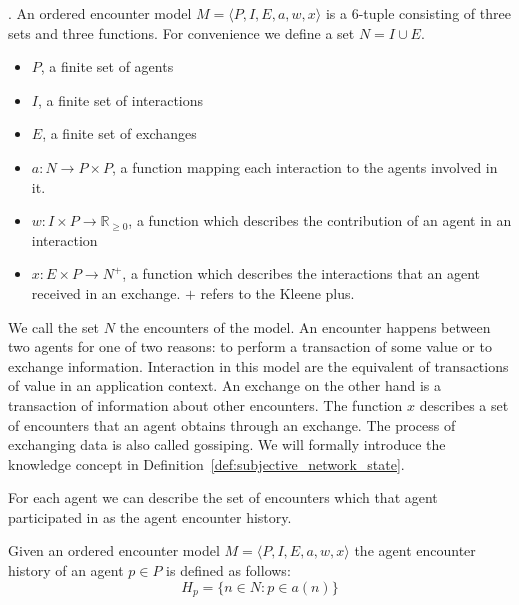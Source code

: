 \begin{defn}. 
    \label{def:base}
    An ordered encounter model $M = \langle P, I, E, a, w, x \rangle$ is a 6-tuple consisting
     of three sets and three functions. For convenience we define a set $N = I \cup E$. 
    \begin{itemize}
        \item $P$, a finite set of agents
        \item $I$, a finite set of interactions
        \item $E$, a finite set of exchanges
        \item $a : N \rightarrow P \times P$, a function mapping each interaction to the agents 
        involved in it.
        \item $w : I \times P \rightarrow \mathbb{R}_{\geq0}$, a function which describes the 
        contribution of an agent in an interaction
        \item $x : E \times P \rightarrow N^+$, a function which describes the interactions that an 
        agent received in an exchange. $+$ refers to the Kleene plus.
    \end{itemize}
\end{defn}

We call the set $N$ the encounters of the model. An encounter happens between two agents for one of
two reasons: to perform a transaction of some value or to exchange information.
Interaction in this model are the equivalent of transactions of value in an application context. 
An exchange on the other hand is a transaction of information about other encounters.
The function $x$ describes a set of encounters that an agent obtains through an 
exchange. The process of exchanging data is also called gossiping. We will formally introduce the 
knowledge concept in Definition~\ref{def:subjective_network_state}.

For each agent we can describe the set of encounters which that agent participated in as the agent 
encounter history. 

\begin{defn}
    Given an ordered encounter model $M = \langle P, I, E, a, w, x \rangle$ the agent encounter history of an agent $p \in P$ is defined as follows:
    \begin{equation}
        H_p = \{ n \in N : p \in a(n) \}
    \end{equation}
\end{defn}


